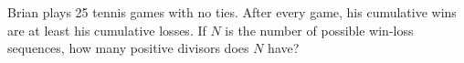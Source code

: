 Brian plays 25 tennis games with no ties. After every game, his cumulative wins are at least his cumulative losses. If $N$ is the number of possible win-loss sequences, how many positive divisors does $N$ have?
